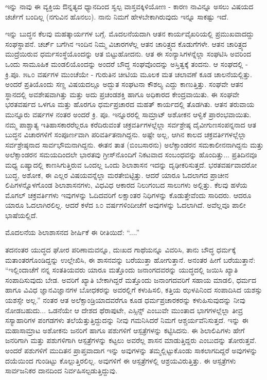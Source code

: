 ಇನ್ನು ನಾವು ಈ ವ್ಯಕ್ತಿಯ ಔನ್ನತ್ಯದ ಧ್ಯಾನದಿಂದ ಸ್ವಲ್ಪ ವಾಸ್ತವಕ್ಕಿಳಿಯೋಣ - ಕಾರಣ ನಾವಿನ್ನೂ ಅಸಲು ವಿಷಯದ ಚರ್ಚೆಗೆ ಬಂದಿಲ್ಲ (ನಗುವಿನ ಹೊನಲು). ನಾನು ನಿಮಗೆ ಹೇಳಬೇಕಾಗಿರುವುದು ಇನ್ನೂ ಸಾಕಷ್ಟು ಇದೆ.

ಇನ್ನು ಬುದ್ಧನ ಕೆಲವು ಮಹತ್ಕಾರ್ಯಗಳ ಬಗ್ಗೆ. ಮೊದಲನೆಯದಾಗಿ ಆತನ ಕಾರ್ಯವೈಖರಿಯಲ್ಲಿ ಪ್ರಮುಖವಾದದ್ದು ಸಂಘಸ್ಥಾಪನೆ. ಚರ್ಚ್ ಬಗೆಗಿನ ಇಂದಿನ ನಿಮ್ಮ ವಿಚಾರಗಳೆಲ್ಲ ಆತನ ಚಾರಿತ್ರ್ಯದ ಕೊಡುಗೆಗಳೇ. ಆತನ ಚಾರಿತ್ರ್ಯದ ಮುದ್ರೆಯಿರುವ ಧರ್ಮಸಂಸ್ಥೆಯೊಂದನ್ನು ಆತ ಬಿಟ್ಟುಹೋದನು. ಆತ ಈ ಸಂನ್ಯಾಸಿಗಳನ್ನೆಲ್ಲಾ ಸಂಘಟಿಸಿ ಅವರಿಂದ ಒಂದು ಸಾಮೂಹಿಕ ಮಂಡಲಿಯೊಂದನ್ನು ಅಂದರೆ ಬೌದ್ಧ ಸಂಘವೊಂದನ್ನು ಅಸ್ತಿತ್ವಕ್ಕೆ ತಂದನು. ಆ ಸಂಘದಲ್ಲಿ - ಕ್ರಿ.ಪೂ. ೫೬೦ ವರ್ಷಗಳ ಮುಂಚೆಯೇ - ಗುರುತಿನ ಚೀಟಿಯ ಮೂಲಕ ಮತ ಚಲಾವಣೆ ಕೂಡ ಚಾಲನೆಯಲ್ಲಿತ್ತು. ಅಂದರೆ ಪ್ರತಿಯೊಂದು ಸಣ್ಣ ವಿಷಯದಲ್ಲೂ ಅದ್ಭುತ ಸಂಘಟನಾ ಕೌಶಲ್ಯ ಎದ್ದು ಕಾಣುತ್ತಿತ್ತು. ಸಂಘವೇ ಆತನ ಸ್ಥಾನದಲ್ಲಿ ಅವಶೇಷವಾಗಿತ್ತು ಮತ್ತು ಅದು ಪ್ರಚಂಡಶಕ್ತಿ ಹಾಗೂ ಅಧಿಕಾರದ ಕೇಂದ್ರವಾಯಿತು. ಈ ಸಂಘವೇ ಭರತವರ್ಷದ ಒಳಗೂ ಮತ್ತು ಹೊರಗೂ ಧರ್ಮಪ್ರಚಾರದ ಮಹತ್ ಕಾರ್ಯದಲ್ಲಿ ತೊಡಗಿತು. ಆತನ ತರುವಾಯ ಮುನ್ನೂರು ವರ್ಷಗಳ ನಂತರ ಅಂದರೆ ಕ್ರಿ. ಪೂ. ಇನ್ನೂರರಲ್ಲಿ ಸಾಮ್ರಾಟ್ ಅಶೋಕನ ಆಳ್ವಿಕೆ ಪ್ರಾರಂಭವಾಯಿತು. ನಮ್ಮ ಪಾಶ್ಚಾತ್ಯ ಇತಿಹಾಸಕಾರರೆಲ್ಲರೂ ಕರೆದಿರುವಂತೆ ಚಕ್ರವರ್ತಿಗಳಲ್ಲೆಲ್ಲಾ ಸರ್ವಶ್ರೇಷ್ಠ ದೈವೀಗುಣಸಂಪನ್ನನಾದ ಆತ ಬುದ್ಧನ ವಿಚಾರಗಳಿಗೆ ಸಂಪೂರ್ಣವಾಗಿ ಪರಿವರ್ತಿತನಾಗಿದ್ದನು. ಅಷ್ಟೇ ಅಲ್ಲ, ಆಗಿನ ಕಾಲದ ಚಕ್ರವರ್ತಿಗಳಲ್ಲೆಲ್ಲಾ ಸರ್ವಶ್ರೇಷ್ಠನಾದ ಸಾರ್ವಭೌಮನಾಗಿದ್ದನು. ಈತನ ತಾತ (ಬಿಂಬಸಾರನು) ಅಲೆಕ್ಸಾಂಡರನ ಸಮಕಾಲೀನನಾಗಿದ್ದನು ಮತ್ತು ಅಲೆಕ್ಸಾಂಡರನ ಸಮಯದಿಂದಲೇ ಭಾರತವು ಗ್ರೀಸ್‌ನೊಂದಿಗೆ ನಿಕಟವಾದ ಸಂಬಂಧವನ್ನು ಹೊಂದಿತ್ತು... ಪ್ರತಿದಿನವೂ ಮಧ್ಯ ಏಷ್ಯಾದಲ್ಲಿ ಕಾಣಸಿಗುತ್ತಿರುವ ಒಂದಲ್ಲ ಒಂದು ಶಿಲಾಶಾಸನ ಇದನ್ನು ದೃಢೀಕರಿಸುತ್ತದೆ. ಭರತವರ್ಷವಾದರೋ ಬುದ್ಧ, ಅಶೋಕ, ಈ ಎಲ್ಲರ ವಿಷಯವನ್ನೆಲ್ಲಾ ಮರತೇಬಿಟ್ಟಿತ್ತು. ಆದರೆ ಯಾರೂ ಓದಲಾಗದ ಪ್ರಾಚೀನ ಲಿಪಿಗಳನ್ನೊಳಗೊಂಡ ಶಿಲಾಶಾಸನಗಳು, ವಿಧವಿಧ ಆಕಾರದ ನಿಲುಗಂಬದ ಸಾಲುಗಳು ಅಲ್ಲಿತ್ತು. ಕೆಲವು ಹಳೆಯ ಮೊಗಲ್ ಚಕ್ರವರ್ತಿಗಳು ಇವುಗಳನ್ನು ಓದಿದವರಿಗೆ ಲಕ್ಷಾಂತರ ನಿಧಿಗಳನ್ನು ಕೊಡುತ್ತೇವೆಂದು ಸಾರಿದರು. ಆದರೂ ಯಾರೂ ಓದಲಾಗಿರಲಿಲ್ಲ. ಆದರೆ ಕಳೆದ ೩೦ ವರ್ಷಗಳಿಂದೀಚೆಗೆ ಅವುಗಳನ್ನು ಓದಲಾಗಿದೆ. ಅವೆಲ್ಲವೂ ಪಾಲೀ ಭಾಷೆಯಲ್ಲಿದೆ.

ಮೊದಲನೆಯ ಶಿಲಾಶಾಸನದ ಶೀರ್ಷಿಕೆ ಈ ರೀತಿಯಿದೆ: “....”

ತದನಂತರ ಯುದ್ಧದ ಘೋರ ಪರಿಣಾಮವನ್ನೂ, ದುಃಖದ ಗಾಥೆಯನ್ನೂ ವಿವರಿಸಿ, ತಾನು ಬೌದ್ಧ ಧರ್ಮಕ್ಕೆ ಮತಾಂತರಗೊಂಡಿದ್ದನ್ನು ಉಲ್ಲೇಖಿಸಿ, ಈ ಶಾಸನವನ್ನು ಬರೆಯುತ್ತಾ ಹೋಗುತ್ತಾನೆ. ಅನಂತರ ಹೀಗೆ ಬರೆಯುತ್ತಾನೆ: “ಇಲ್ಲಿಂದಾಚೆಗೆ ನನ್ನ ಸಂತತಿಯವರು ಯಾರೂ ಮತ್ತೊಂದು ಜನಾಂಗದವರನ್ನು ಯುದ್ಧದಲ್ಲಿ ಜಯಿಸಿ ಖ್ಯಾತಿ ಸಂಪಾದಿಸುವುದು ಬೇಡ. ಅವರಿಗೆ ಖ್ಯಾತಿ ಬೇಕಾಗಿದ್ದರೆ ಮತ್ತೊಂದು ಜನಾಂಗದವರಿಗೆ ಸಹಾಯ ಮಾಡಲಿ, ಧರ್ಮದ ಹಾಗೂ ವಿವಿಧ ಜ್ಞಾನವಿಜ್ಞಾನಗಳ ಬೋಧಕರನ್ನು ಅವರಲ್ಲಿಗೆ ಕಳುಹಿಸಲಿ, ಕತ್ತಿಯ ಝಳಪಿನಿಂದ ಸಂಪಾದಿಸಿದ ಯಶಸ್ಸು ಯಶಸ್ಸೇ ಅಲ್ಲ.” ನಂತರ ಆತ ಅಲೆಕ್ಸಾಂಡ್ರಿಯಾದವರೆಗೂ ಕೂಡ ಧರ್ಮಪ್ರಚಾರಕರನ್ನು ಕಳುಹಿಸುವುದನ್ನು ನೀವು ನೋಡಬಹುದು... ಒಡನೆಯೇ ಆ ದೇಶದ ಥೆರಾಪುಟೇ, ಎಸ್ಸಿನ್ಸ್ ಎಂಬುವೇ ಮುಂತಾದ ಭಾಗಗಳಲ್ಲೆಲ್ಲಾ ತೀವ್ರ ಸಸ್ಯಾಹಾರಿಗಳ ಪಂಗಡಗಳು ತಲೆಯೆತ್ತುತ್ತಿದ್ದುದನ್ನು ನೀವು ಗಮನಿಸಿದರೆ ನಿಮಗೆ ಆಶ್ಚರ್ಯವೆನಿಸುತ್ತದೆ. ಇನ್ನು ಈ ಮಹಾಸಾಮ್ರಾಟ ಅಶೋಕನು ಜನರಿಗೆ ಹಾಗೂ ಪಶುಗಳಿಗೆ ಆಸ್ಪತ್ರೆಗಳನ್ನು ಕಟ್ಟಿಸಿದನು. ಈ ಶಿಲಾಲಿಪಿಗಳು ಹೇಗೆ ಜನರಿಗಾಗಿ ಮತ್ತು ಪಶುಗಳಿಗಾಗಿ ಆಸ್ಪತ್ರೆಗಳನ್ನು ಕಟ್ಟಲು ಅವರೆಲ್ಲ ಶಾಸನ ಮಾಡುತ್ತಿದ್ದರು ಎಂಬುದನ್ನು ತೋರುತ್ತವೆ. ಅಂದರೆ ಪಶುಗಳಿಗೆ ಮುದಿತನ ಪ್ರಾಪ್ತವಾದಾಗ ಇನ್ನು ಅವುಗಳನ್ನು ತಮ್ಮಲ್ಲಿಟ್ಟುಕೊಂಡು ಸಾಕಲಾಗದಿದ್ದರೆ ಅವುಗಳನ್ನು ದಯೆಯಿಂದ ಗುಂಡಿಟ್ಟು ಕೊಲ್ಲುತ್ತಿರಲಿಲ್ಲ. ಅವುಗಳಿಗೆ ಈ ಆಸ್ಪತ್ರೆಗಳಲ್ಲಿ ಆಶ್ರಯವಿರುತ್ತಿತ್ತು. ಈ ಆಸ್ಪತ್ರೆಗಳು ಸಾರ್ವಜನಿಕರ ದಾನದಿಂದ ನಿರ್ವಹಿಸಲ್ಪಡುತ್ತಿದ್ದುವು.

